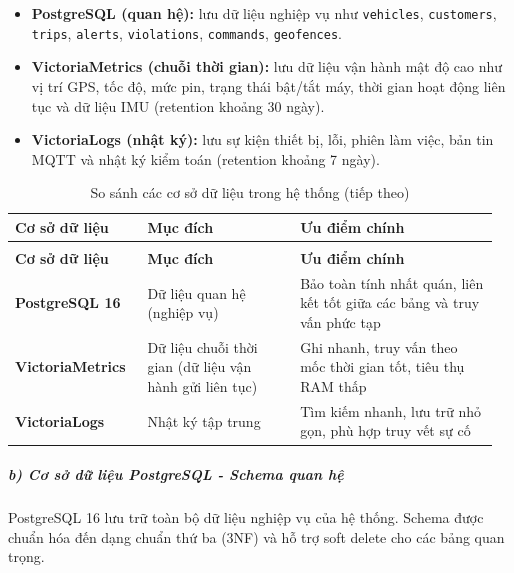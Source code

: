 \documentclass[a4paper]{extarticle}
\newcommand{\thesissettableid}[2]{%
  \renewcommand{\thetable}{#1}%
  \renewcommand{\theHtable}{#2}%
}
\providecommand{\tightlist}{%
  \setlength{\itemsep}{0pt}\setlength{\parskip}{0pt}}
\begin{document}
\begin{itemize}
\tightlist
\item
  \textbf{PostgreSQL (quan hệ):} lưu dữ liệu nghiệp vụ như
  \texttt{vehicles}, \texttt{customers}, \texttt{trips}, \texttt{alerts},
  \texttt{violations}, \texttt{commands}, \texttt{geofences}.
\item
  \textbf{VictoriaMetrics (chuỗi thời gian):} lưu dữ liệu vận hành mật độ
  cao như vị trí GPS, tốc độ, mức pin, trạng thái bật/tắt máy, thời gian hoạt động liên tục và dữ liệu IMU
  (retention khoảng 30 ngày).
\item
  \textbf{VictoriaLogs (nhật ký):} lưu sự kiện thiết bị, lỗi, phiên làm
  việc, bản tin MQTT và nhật ký kiểm toán (retention khoảng 7 ngày).
\end{itemize}


{\thesissettableid{3.18}{tab-ch3-so-sanh-cac-co-so-du-lieu-trong-he-thong}
\def\LTcaptype{table}
\begin{longtable}{|L{0.269\linewidth}|L{0.305\linewidth}|L{0.390\linewidth}|}
\caption{So sánh các cơ sở dữ liệu trong hệ thống}\label{tab:ch3-so-sanh-cac-co-so-du-lieu-trong-he-thong}\\
\hline \textbf{Cơ sở dữ liệu} & \textbf{Mục đích} & \textbf{Ưu điểm chính} \\
\hline
\endfirsthead
\caption[]{So sánh các cơ sở dữ liệu trong hệ thống (tiếp theo)}\\
\hline \textbf{Cơ sở dữ liệu} & \textbf{Mục đích} & \textbf{Ưu điểm chính} \\
\hline
\endhead
\hline
\endfoot
\endlastfoot
\textbf{PostgreSQL 16} & Dữ liệu quan hệ (nghiệp vụ) & Bảo toàn tính nhất quán,
liên kết tốt giữa các bảng và truy vấn phức tạp \\\hline
\textbf{VictoriaMetrics} & Dữ liệu chuỗi thời gian (dữ liệu vận hành gửi liên tục) & Ghi nhanh,
truy vấn theo mốc thời gian tốt, tiêu thụ RAM thấp \\\hline
\textbf{VictoriaLogs} & Nhật ký tập trung & Tìm kiếm nhanh,
lưu trữ nhỏ gọn, phù hợp truy vết sự cố \\\hline
\end{longtable}
}


\subparagraph{b) Cơ sở dữ liệu PostgreSQL - Schema quan
hệ}\label{b-cux1a1-sux1edf-dux1eef-liux1ec7u-postgresql---schema-quan-hux1ec7}

PostgreSQL 16 lưu trữ toàn bộ dữ liệu nghiệp vụ của hệ thống. Schema
được chuẩn hóa đến dạng chuẩn thứ ba (3NF) và hỗ trợ soft delete cho các
bảng quan trọng.
\end{document}

